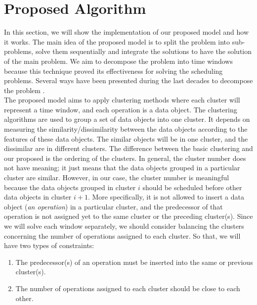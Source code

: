 \documentclass[runningheads]{llncs}
\begin{document}
\section{Proposed Algorithm}

In this section, we will show the implementation of our proposed model and how it works. The main idea of the proposed model is to split the problem into sub-problems, solve them sequentially and integrate the solutions to have the solution of the main problem. We aim to decompose the problem into time windows because this technique proved its effectiveness for solving the scheduling problems. Several ways have been presented during the last decades to decompose the problem  \cite{zhai2014decomposition,singer2001decomposition,ovacik2012decomposition,uzsoy2000performance}.\\ 

The proposed model aims to apply clustering methods where each cluster will represent a time window, and each operation is a data object. The clustering algorithms are used to group a set of data objects into one cluster. It depends on measuring the similarity/dissimilarity between the data objects according to the features of these data objects. The similar objects will be in one cluster, and the dissimilar are in different clusters. The difference between the basic clustering and our proposed is the ordering of the clusters. In general, the cluster number does not have meaning; it just means that the data objects grouped in a particular cluster are similar. However, in our case, the cluster number is meaningful because the data objects grouped in cluster $i$ should be scheduled before other data objects in cluster $i+1$. More specifically, it is not allowed to insert a data object (\textit{an operation}) in a particular cluster, and the predecessor of that operation is not assigned yet to the same cluster or the preceding cluster(s). Since we will solve each window separately, we should consider balancing the clusters concerning the number of operations assigned to each cluster. So that, we will have two types of constraints:
\begin{enumerate}
\item The predecessor(s) of an operation must be inserted into the same or previous cluster(s).
\item The number of operations assigned to each cluster should be close to each other.
\end{enumerate}
\end{document}
